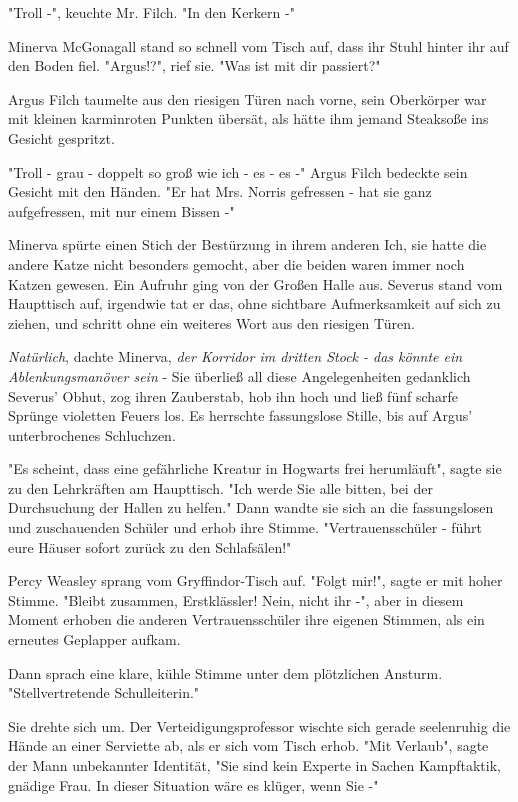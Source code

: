 {"Troll -", keuchte Mr. Filch. "In den Kerkern -"

Minerva McGonagall stand so schnell vom Tisch auf, dass ihr Stuhl hinter ihr auf den Boden fiel. "Argus!?", rief sie. "Was ist mit dir passiert?"

Argus Filch taumelte aus den riesigen Türen nach vorne, sein Oberkörper war mit kleinen karminroten Punkten übersät, als hätte ihm jemand Steaksoße ins Gesicht gespritzt.

"Troll - grau - doppelt so groß wie ich - es - es -" Argus Filch bedeckte sein Gesicht mit den Händen. "Er hat Mrs. Norris gefressen - hat sie ganz aufgefressen, mit nur einem Bissen -"

Minerva spürte einen Stich der Bestürzung in ihrem anderen Ich, sie hatte die andere Katze nicht besonders gemocht, aber die beiden waren immer noch Katzen gewesen. Ein Aufruhr ging von der Großen Halle aus. Severus stand vom Haupttisch auf, irgendwie tat er das, ohne sichtbare Aufmerksamkeit auf sich zu ziehen, und schritt ohne ein weiteres Wort aus den riesigen Türen.

\emph{Natürlich}, dachte Minerva, \emph{der Korridor im dritten Stock - das könnte ein Ablenkungsmanöver sein} - Sie überließ all diese Angelegenheiten gedanklich Severus' Obhut, zog ihren Zauberstab, hob ihn hoch und ließ fünf scharfe Sprünge violetten Feuers los. Es herrschte fassungslose Stille, bis auf Argus' unterbrochenes Schluchzen.

"Es scheint, dass eine gefährliche Kreatur in Hogwarts frei herumläuft", sagte sie zu den Lehrkräften am Haupttisch. "Ich werde Sie alle bitten, bei der Durchsuchung der Hallen zu helfen." Dann wandte sie sich an die fassungslosen und zuschauenden Schüler und erhob ihre Stimme. "Vertrauensschüler - führt eure Häuser sofort zurück zu den Schlafsälen!"

Percy Weasley sprang vom Gryffindor-Tisch auf. "Folgt mir!", sagte er mit hoher Stimme. "Bleibt zusammen, Erstklässler! Nein, nicht ihr -", aber in diesem Moment erhoben die anderen Vertrauensschüler ihre eigenen Stimmen, als ein erneutes Geplapper aufkam.

Dann sprach eine klare, kühle Stimme unter dem plötzlichen Ansturm. "Stellvertretende Schulleiterin."

Sie drehte sich um. Der Verteidigungsprofessor wischte sich gerade seelenruhig die Hände an einer Serviette ab, als er sich vom Tisch erhob. "Mit Verlaub", sagte der Mann unbekannter Identität, "Sie sind kein Experte in Sachen Kampftaktik, gnädige Frau. In dieser Situation wäre es klüger, wenn Sie -"

}
